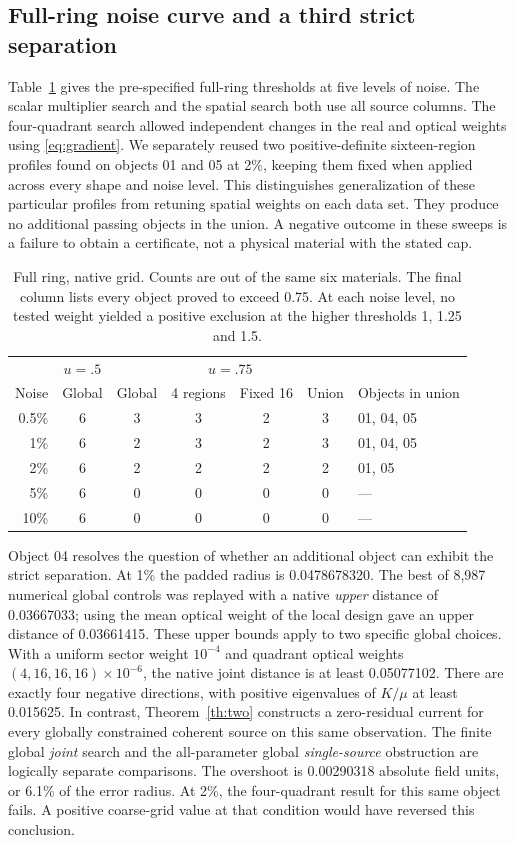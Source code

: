 \documentclass[anonymous,12pt]{iopjournal}
\theoremstyle{remark}\newtheorem{remark}[theorem]{Remark}
\numberwithin{equation}{section}
\begin{document}
\subsection{Full-ring noise curve and a third strict separation}
Table~\ref{tab:noise} gives the pre-specified full-ring thresholds at five levels of noise. The scalar multiplier search and the spatial search both use all source columns. The four-quadrant search allowed independent changes in the real and optical weights using \eqref{eq:gradient}. We separately reused two positive-definite sixteen-region profiles found on objects 01 and 05 at 2\%, keeping them fixed when applied across every shape and noise level. This distinguishes generalization of these particular profiles from retuning spatial weights on each data set. They produce no additional passing objects in the union. A negative outcome in these sweeps is a failure to obtain a certificate, not a physical material with the stated cap.

\begin{table}[tb]
\caption{Full ring, native grid. Counts are out of the same six materials. The final column lists every object proved to exceed 0.75. At each noise level, no tested weight yielded a positive exclusion at the higher thresholds 1, 1.25 and 1.5.}\label{tab:noise}
\centering\begin{tabular}{rccccc l}\toprule
 & $u=.5$ &\multicolumn{4}{c}{$u=.75$} & \\
Noise & Global & Global & 4 regions & Fixed 16 & Union & Objects in union\\ \midrule
0.5\% &6&3&3&2&3&01, 04, 05\\
1\%   &6&2&3&2&3&01, 04, 05\\
2\%   &6&2&2&2&2&01, 05\\
5\%   &6&0&0&0&0&---\\
10\%  &6&0&0&0&0&---\\ \bottomrule
\end{tabular}
\end{table}

Object 04 resolves the question of whether an additional object can exhibit the strict separation. At 1\% the padded radius is 0.0478678320. The best of 8,987 numerical global controls was replayed with a native \emph{upper} distance of 0.03667033; using the mean optical weight of the local design gave an upper distance of 0.03661415. These upper bounds apply to two specific global choices. With a uniform sector weight $10^{-4}$ and quadrant optical weights $(4,16,16,16)\times10^{-6}$, the native joint distance is at least 0.05077102. There are exactly four negative directions, with positive eigenvalues of $K/\mu$ at least 0.015625. In contrast, Theorem~\ref{th:two} constructs a zero-residual current for every globally constrained coherent source on this same observation. The finite global \emph{joint} search and the all-parameter global \emph{single-source} obstruction are logically separate comparisons. The overshoot is 0.00290318 absolute field units, or 6.1\% of the error radius. At 2\%, the four-quadrant result for this same object fails. A positive coarse-grid value at that condition would have reversed this conclusion.
\end{document}
